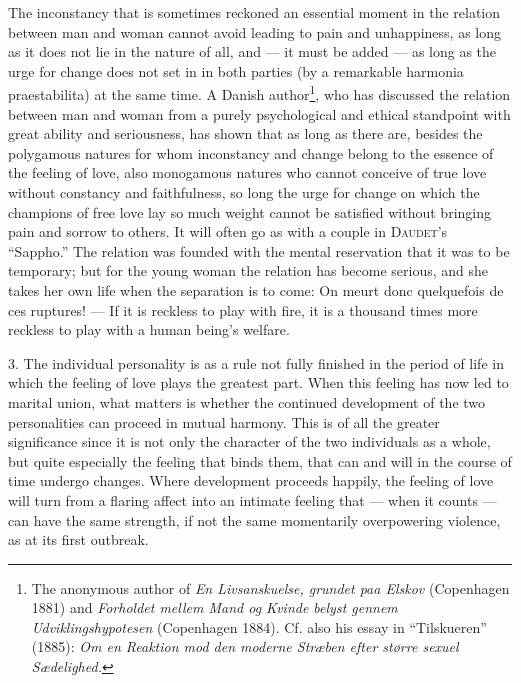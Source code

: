 \documentclass[12pt,a4paper,openany]{book}
\newcommand{\opage}[1]{\marginnote{\footnotesize\textit{[#1]}}}
\begin{document}
The inconstancy that is sometimes reckoned an essential moment in the relation between man and woman cannot avoid
leading to pain and unhappiness, as long as it does not lie in the nature of all, and --- it must be added --- as long
as the urge for change does not set in in both parties (by a remarkable harmonia praestabilita) at the same time. A
Danish author\footnote[1]{The anonymous author of \textit{En Livsanskuelse, grundet paa Elskov} (Copenhagen 1881) and
\textit{Forholdet mellem Mand og Kvinde belyst gennem Udviklingshypotesen} (Copenhagen 1884). Cf. also his essay in
``Tilskueren'' (1885): \textit{Om en Reaktion mod den moderne Stræben efter større sexuel Sædelighed.}}, who has
discussed the relation between man and woman from a purely psychological and ethical standpoint with great ability and
seriousness, has shown that as long as there are, besides the polygamous natures for whom inconstancy and change belong
to the essence of the feeling of love, also monogamous natures who cannot conceive of true love without constancy and
faithfulness, so long the urge for change on which the champions of free love lay so much weight cannot be satisfied
without bringing pain and sorrow to others. It will often go as with a couple in \textsc{Daudet}'s ``Sappho.'' The
relation was founded with the mental reservation that it was to be temporary; but for the young woman the relation has
become serious, and she takes her own life when the separation is to come: On meurt donc quelquefois de ces ruptures!
--- If it is reckless to play with fire, it is a thousand times more reckless to play with a human being's welfare.

3. The individual personality is as a rule not fully finished in the period of life in which the feeling of love plays
the greatest part. When this feeling has now led to marital union, what matters is whether the continued development of
the two personalities can proceed in mutual harmony. This is of all the greater significance since it is not only the
character of the two individuals as a whole, but quite especially the feeling that binds them, that can and will in
the course of time
\opage{291}undergo changes. Where development proceeds happily, the feeling of love will turn from a flaring affect into
an intimate feeling that --- when it counts --- can have the same strength, if not the same momentarily overpowering
violence, as at its first outbreak.
\end{document}
